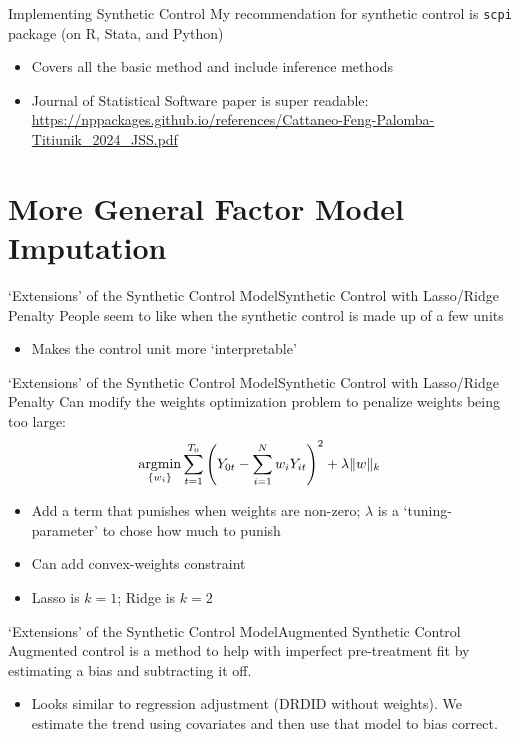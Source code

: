 \documentclass[t]{beamer}
\begin{document}
\begin{frame}{Implementing Synthetic Control}
  My recommendation for synthetic control is \texttt{scpi} package (on R, Stata, and Python)
  \begin{itemize}
    \item Covers all the basic method and include inference methods

    \item Journal of Statistical Software paper is super readable: \url{https://nppackages.github.io/references/Cattaneo-Feng-Palomba-Titiunik_2024_JSS.pdf}
  \end{itemize}

\end{frame}


\section{More General Factor Model Imputation}

\begin{frame}{`Extensions' of the Synthetic Control Model}{Synthetic Control with Lasso/Ridge Penalty}
  People seem to like when the synthetic control is made up of a few units
  \begin{itemize}
    \item Makes the control unit more `interpretable'
  \end{itemize}
\end{frame}

\begin{frame}{`Extensions' of the Synthetic Control Model}{Synthetic Control with Lasso/Ridge Penalty}
  Can modify the weights optimization problem to penalize weights being too large:
  $$
    \operatorname*{argmin}_{ \{ w_i \} } \sum_{t=1}^{T_0} \left( Y_{0t} - \sum_{i=1}^N w_i Y_{it} \right)^2 + \lambda \| w \|_k
  $$
  \begin{itemize}
    \item Add a term that punishes when weights are non-zero; $\lambda$ is a `tuning-parameter' to chose how much to punish
    \item Can add convex-weights constraint
    \item Lasso is $k = 1$; Ridge is $k = 2$
  \end{itemize}
\end{frame}


\begin{frame}{`Extensions' of the Synthetic Control Model}{Augmented Synthetic Control}
  Augmented control is a method to help with imperfect pre-treatment fit by estimating a bias and subtracting it off. 
  \begin{itemize}
    \item Looks similar to regression adjustment (DRDID without weights). We estimate the trend using covariates and then use that model to bias correct. 
  \end{itemize}
\end{frame}
\end{document}

